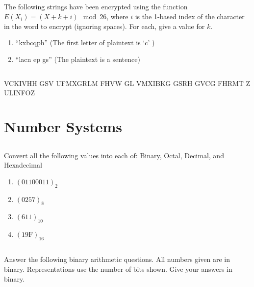 \documentclass[twocolumn]{article}
\begin{document}
\subsection{}

    The following strings have been encrypted using the function $E(X_i) = (X + k + i) \mod 26$, where $i$ is the 1-based index of the character in the word to encrypt (ignoring spaces). For each, give a value for $k$.

    \begin{enumerate}
        \item ``kxbcqph'' (The first letter of plaintext is `c' )
        \item ``lacn ep gs'' (The plaintext is a sentence)
    \end{enumerate}

\subsection{}

VCKIVHH GSV UFMXGRLM FHVW GL VMXIBKG GSRH GVCG FHRMT Z ULINFOZ

\clearpage
\section{Number Systems}

\subsection{}

    Convert all the following values into each of: Binary, Octal, Decimal, and Hexadecimal

    \begin{enumerate}
        \item $ ( 01100011 )_2 $
        \item $ ( 0257)_8 $
        \item $ ( 611 )_{10} $
        \item $ ( 19\text{F} )_{16} $
    \end{enumerate}

\subsection{}

    Answer the following binary arithmetic questions. All numbers given are in binary. Representations use the number of bits shown. Give your answers in binary.
\end{document}
